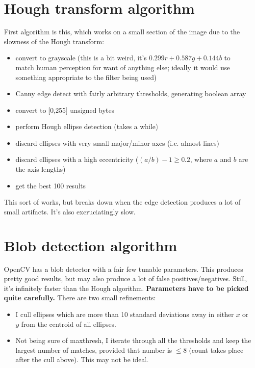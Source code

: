 

\section{Hough transform algorithm}
First algorithm is this, which works on a small section of the image due to the
slowness of the Hough transform:
\begin{itemize}
\item convert to grayscale (this is a bit weird, it's
$0.299r+0.587g+0.144b$ to match human perception for want of anything else; ideally
it would use something appropriate to the filter being used)
\item Canny edge detect with fairly arbitrary thresholds, generating boolean array
\item convert to [0,255] unsigned bytes
\item perform Hough ellipse detection (takes a while)
\item discard ellipses with very small major/minor axes (i.e. almost-lines)
\item discard ellipses with a high eccentricity ($(a/b)-1 \ge 0.2$, where $a$ and $b$ are
the axis lengths)
\item get the best 100 results
\end{itemize}
This sort of works, but breaks down when the edge detection produces a lot of small artifacts.
It's also excruciatingly slow.

\section{Blob detection algorithm}
OpenCV has a blob detector with a fair few tunable parameters. This produces pretty good results,
but may also produce a lot of false positives/negatives. Still, it's infinitely faster than the
Hough algorithm. \textbf{Parameters have to be picked quite carefully.} There are two small refinements:
\begin{itemize}
\item I cull ellipses which are more than 10 standard deviations away in either $x$ or $y$ from
the centroid of all ellipses.
\item Not being sure of maxthresh, I iterate through all the thresholds and keep the largest number of
matches, provided that number is $\le 8$ (count takes place after the cull above). This may not be ideal.
\end{itemize}


